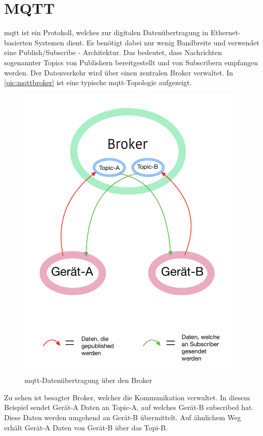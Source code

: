 \newpage
\section{MQTT} 
\label{sec:mqtt}
\acrfull{mqtt} ist ein Protokoll, welches zur digitalen Datenübertragung in Ethernet-basierten Systemen dient. Es benötigt dabei nur wenig Bandbreite und verwendet eine Publish/Subscribe - Architektur. Das bedeutet, dass Nachrichten sogenannter Topics von Publishern bereitgestellt und von Subscribern empfangen werden. Der Datenverkehr wird über einen zentralen Broker verwaltet. In \autoref{pic:mqttbroker} ist eine typische \acrshort{mqtt}-Topologie aufgezeigt. 

\begin{figure}[h]
    \begin{center}
        \includegraphics[width=11cm]{mqtt.pdf}
        \caption{
			\label{pic:mqttbroker}\acrshort{mqtt}-Datenübertragung über den Broker}
    \end{center}
\end{figure}
\newpage
Zu sehen ist besagter Broker, welcher die Kommunikation verwaltet. In diesem Beispiel sendet  Gerät-A Daten an Topic-A, auf welches Gerät-B subscribed hat. Diese Daten werden umgehend an Gerät-B übermittelt. Auf ähnlichem Weg erhält Gerät-A Daten von Gerät-B über das Topi-B.\\
